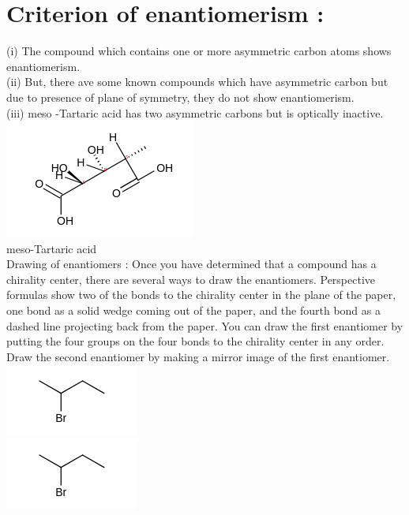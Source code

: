 \documentclass[10pt]{article}
\begin{document}
\section*{Criterion of enantiomerism :}
(i) The compound which contains one or more asymmetric carbon atoms shows enantiomerism.\\
(ii) But, there ave some known compounds which have asymmetric carbon but due to presence of plane of symmetry, they do not show enantiomerism.\\
(iii) meso -Tartaric acid has two asymmetric carbons but is optically inactive.\\
\includegraphics{smile-c43fc3aec9a5f9c18e9f55fadba822f902390972}\\
meso-Tartaric acid\\
Drawing of enantiomers : Once you have determined that a compound has a chirality center, there are several ways to draw the enantiomers. Perspective formulas show two of the bonds to the chirality center in the plane of the paper, one bond as a solid wedge coming out of the paper, and the fourth bond as a dashed line projecting back from the paper. You can draw the first enantiomer by putting the four groups on the four bonds to the chirality center in any order. Draw the second enantiomer by making a mirror image of the first enantiomer.\\
\includegraphics{smile-9ceb0671aae8a0d7175850ba4cb5108316a465c9}\\
\includegraphics{smile-c1987700d5ec476d44c7b40a1c6d1088abe3de8d}
\end{document}
